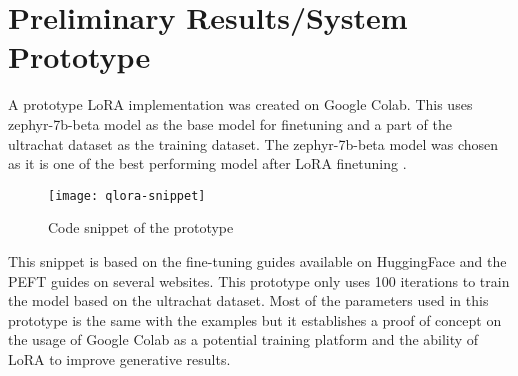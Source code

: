 \chapter{Preliminary Results/System Prototype}
A prototype LoRA implementation was created on Google Colab. 
This uses zephyr-7b-beta model as the base model for finetuning and a part of the ultrachat dataset as the training dataset.
The zephyr-7b-beta model was chosen as it is one of the best performing model after LoRA finetuning \cite{zhao2024loraland310finetuned}.
\begin{figure}
    \caption{Code snippet of the prototype}
    \centering
    \texttt{[image: qlora-snippet]}
\end{figure}

This snippet is based on the fine-tuning guides available on HuggingFace and the PEFT guides on several websites.
This prototype only uses 100 iterations to train the model based on the ultrachat dataset.
Most of the parameters used in this prototype is the same with the examples but it establishes a proof of concept on the usage of Google Colab as a potential training platform and the ability of LoRA to improve generative results.

